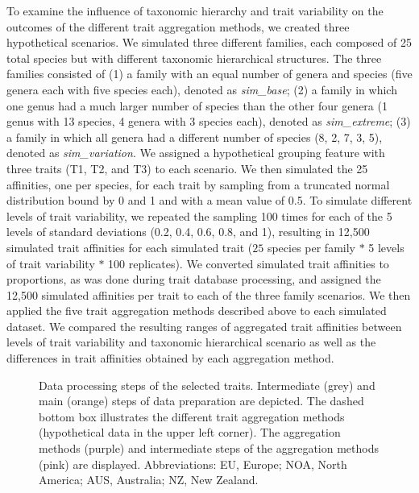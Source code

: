 \documentclass{article}
\begin{document}
To examine the influence of taxonomic hierarchy and trait variability on the outcomes of the different trait aggregation methods, we created three hypothetical scenarios. We simulated three different families, each composed of 25 total species but with different taxonomic hierarchical structures.  The three families consisted of (1) a family with an equal number of genera and species (five genera each with five species each), denoted as \textit{sim\_base}; (2) a family in which one genus had a much larger number of species than the other four genera (1 genus with 13 species, 4 genera with 3 species each), denoted as \textit{sim\_extreme}; (3) a family in which all genera had a different number of species (8, 2, 7, 3, 5), denoted as \textit{sim\_variation}. We assigned a hypothetical grouping feature with three traits (T1, T2, and T3) to each scenario. We then simulated the 25 affinities, one per species, for each trait by sampling from a truncated normal distribution bound by 0 and 1 and with a mean value of 0.5. To simulate different levels of trait variability, we repeated the sampling 100 times for each of the 5 levels of standard deviations (0.2, 0.4, 0.6, 0.8, and 1), resulting in 12,500 simulated trait affinities for each simulated trait ($25$ species per family $*$ 5 levels of trait variability $*$ 100 replicates). We converted simulated trait affinities to proportions, as was done during trait database processing, and assigned the 12,500 simulated affinities per trait to each of the three family scenarios. We then applied the five trait aggregation methods described above to each simulated dataset. We compared the resulting ranges of aggregated trait affinities between levels of trait variability and taxonomic hierarchical scenario as well as the differences in trait affinities obtained by each aggregation method.

\begin{figure}
  \centering
  
  \caption{Data processing steps of the selected traits. Intermediate (grey) and main (orange) steps of data preparation are depicted. The dashed bottom box illustrates the different trait aggregation methods (hypothetical data in the upper left corner). The aggregation methods (purple) and intermediate steps of the aggregation methods (pink) are displayed. Abbreviations: EU, Europe; NOA, North America; AUS, Australia; NZ, New Zealand.}
  \label{fig:data_proc_overview}
\end{figure}

\newpage
\end{document}
